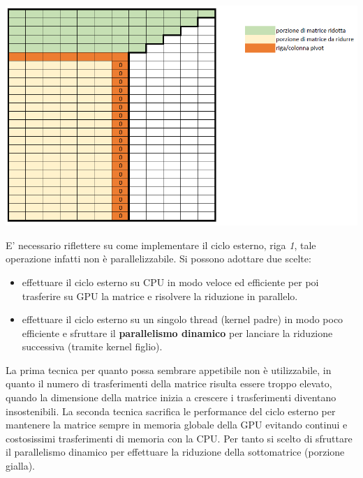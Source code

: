 \documentclass{article}
\begin{document}
	\begin{center}
		\includegraphics[width = \textwidth]{matrice.png}
		\label{fig:mat}
	\end{center}

E' necessario riflettere su come implementare il ciclo esterno, riga \textit{1}, tale operazione infatti non è parallelizzabile. Si possono adottare due scelte:
\begin{itemize}
\item effettuare il ciclo esterno su CPU in modo veloce ed efficiente per poi trasferire su GPU la matrice e risolvere la riduzione in parallelo.
\item effettuare il ciclo esterno su un singolo thread (kernel padre) in modo poco efficiente e sfruttare il \textbf{parallelismo dinamico} per lanciare la riduzione successiva (tramite kernel figlio).
\end{itemize}

La prima tecnica per quanto possa sembrare appetibile non è utilizzabile, in quanto il numero di trasferimenti della matrice risulta essere troppo elevato, quando la dimensione della matrice inizia a crescere i trasferimenti diventano insostenibili. La seconda tecnica sacrifica le performance del ciclo esterno per mantenere la matrice sempre in memoria globale della GPU evitando continui e costosissimi trasferimenti di memoria con la CPU. Per tanto si scelto di sfruttare il parallelismo dinamico per effettuare la riduzione della sottomatrice (porzione gialla).
\end{document}
